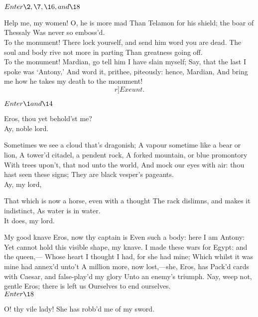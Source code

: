 \documentclass{book}
\begin{document}


	\(Enter \2, \7, \16, and \18\)

\2	Help me, my women! O, he is more mad
	Than Telamon for his shield; the boar of Thessaly
	Was never so emboss'd. \\

\7	To the monument!
	There lock yourself, and send him word you are dead.
	The soul and body rive not more in parting
	Than greatness going off. \\

\2	To the monument!
	Mardian, go tell him I have slain myself;
	Say, that the last I spoke was `Antony,'
	And word it, prithee, piteously: hence, Mardian,
	And bring me how he takes my death to the monument! \[r]Exeunt.\]




	\(Enter \1 and \14\)

\1	Eros, thou yet behold'st me? \\

	Ay, noble lord.

\1	Sometimes we see a cloud that's dragonish;
	A vapour sometime like a bear or lion,
	A tower'd citadel, a pendent rock,
	A forked mountain, or blue promontory
	With trees upon't, that nod unto the world,
	And mock our eyes with air: thou hast seen these signs;
	They are black vesper's pageants. \\

	Ay, my lord,

\1	That which is now a horse, even with a thought
	The rack dislimns, and makes it indistinct,
	As water is in water. \\

	It does, my lord.

\1	My good knave Eros, now thy captain is
	Even such a body: here I am Antony:
	Yet cannot hold this visible shape, my knave.
	I made these wars for Egypt: and the queen,---
	Whose heart I thought I had, for she had mine;
	Which whilst it was mine had annex'd unto't
	A million more, now lost,---she, Eros, has
	Pack'd cards with Caesar, and false-play'd my glory
	Unto an enemy's triumph.
	Nay, weep not, gentle Eros; there is left us
	Ourselves to end ourselves. \\


	\(Enter \18\)

		      O! thy vile lady!
	She has robb'd me of my sword. \\
\end{document}
